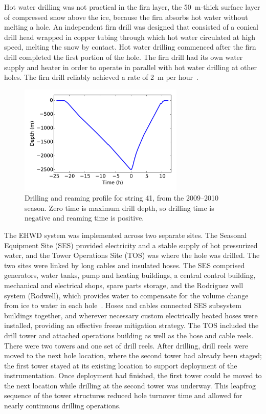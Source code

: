 Hot water drilling was not practical in the firn layer, the 50~m-thick surface layer of
compressed snow above the ice, because the firn
absorbs hot water without melting a hole.  An independent
firn drill was designed that consisted of a conical drill
head wrapped in copper tubing through which hot water circulated at high speed,
melting the snow by contact. Hot water drilling commenced after the firn
drill completed the first portion of the hole. The firn drill had its own
water supply and heater in order to operate in parallel with hot water drilling
at other holes. The firn drill reliably achieved a rate of 2~m per hour~\cite{ehwd}.

\begin{figure}[!ht]
 \centering
 \includegraphics[width=0.7\textwidth]{graphics/drill/drill_depth_hole41.pdf}
\caption{Drilling and reaming profile for string 41, from the 2009--2010
  season. Zero time is maximum drill depth, so drilling time is
  negative and reaming time is positive.}
\label{fig:drilldepthtime}
\end{figure}

The EHWD system was implemented across two separate sites. The Seasonal
Equipment Site (SES) provided electricity and a stable supply of hot
pressurized water, and the Tower Operations Site (TOS) was where the hole
was drilled.  The two sites were linked by long cables and insulated
hoses. The SES comprised generators, water tanks, pump and heating
buildings, a central control building, mechanical and electrical shops,
spare parts storage, and the Rodriguez well system (Rodwell), which
provides water to compensate for the volume change from ice to water
in each hole~\cite{rodriguez_well}. Hoses and cables connected SES subsystem buildings together, and
wherever necessary custom electrically heated hoses were installed,
providing an effective freeze mitigation strategy. The TOS included the
drill tower and attached operations building as well as the hose and cable
reels.  There were two towers and one set of drill reels.  After drilling,
drill reels were moved to the next hole location, where the second tower
had already been staged; the first tower stayed at its existing location
to support deployment of the instrumentation.  Once deployment had
finished, the first tower could be moved to the next location while
drilling at the second tower was underway.  This leapfrog sequence of the
tower structures reduced hole turnover time and allowed for nearly
continuous drilling operations.

